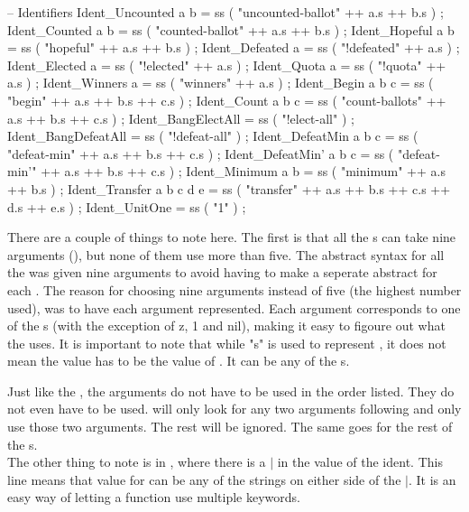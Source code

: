 \begin{lstgf}
        -- Identifiers
        Ident_Uncounted a b             = ss ( "uncounted-ballot" ++ a.s ++ b.s ) ;
        Ident_Counted a b               = ss ( "counted-ballot" ++ a.s ++ b.s ) ;
        Ident_Hopeful a b               = ss ( "hopeful" ++ a.s ++ b.s ) ;
        Ident_Defeated a                = ss ( "!defeated" ++ a.s ) ;
        Ident_Elected a                 = ss ( "!elected" ++ a.s ) ;
        Ident_Quota a                   = ss ( "!quota" ++ a.s ) ;
        Ident_Winners a                 = ss ( "winners" ++ a.s ) ;
        Ident_Begin a b c               = ss ( "begin" ++ a.s ++ b.s ++ c.s ) ;
        Ident_Count a b c               = ss ( "count-ballots" ++ a.s ++ b.s ++ c.s ) ;
        Ident_BangElectAll              = ss ( "!elect-all" ) ;
        Ident_BangDefeatAll             = ss ( "!defeat-all" ) ;
        Ident_DefeatMin a b c           = ss ( "defeat-min" ++ a.s ++ b.s ++ c.s ) ;
        Ident_DefeatMin' a b c          = ss ( "defeat-min'" ++ a.s ++ b.s ++ c.s ) ;
        Ident_Minimum a b               = ss ( "minimum" ++ a.s ++ b.s ) ;
        Ident_Transfer a b c d e        = ss ( "transfer" ++ a.s ++ b.s ++ c.s ++ d.s ++ e.s ) ;
        Ident_UnitOne                   = ss ( "1" ) ;
\end{lstgf}


There are a couple of things to note here. The first is that all the s can take nine arguments (), but none of them use more than five. The abstract syntax for all the  was given nine arguments to avoid having to make a seperate abstract for each . The reason for choosing nine arguments instead of five (the highest number used), was to have each argument represented. Each argument corresponds to one of the s (with the exception of z, 1 and nil), making it easy to figoure out what the  uses. It is important to note that while "s" is used to represent , it does not mean the value has to be the value of . It can be any of the s. 

Just like the , the arguments do not have to be used in the order listed. They do not even have to be used.  will only look for any two arguments following and only use those two arguments. The rest will be ignored. The same goes for the rest of the s. \\
The other thing to note is in , where there is a $|$ in the value of the ident. This line means that value for  can be any of the strings on either side of the $|$. It is an easy way of letting a function use multiple keywords.

